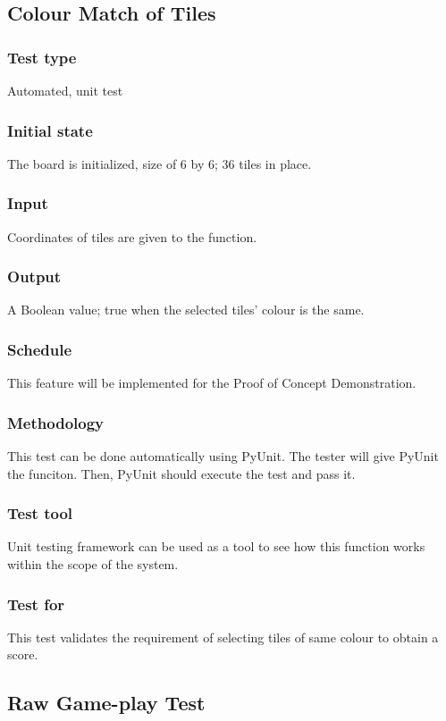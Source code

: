 \documentclass[12pt]{article}
\begin{document}
\newpage

\subsection{Colour Match of Tiles}
\subsubsection{Test type}
Automated, unit test
\subsubsection{Initial state}
The board is initialized, size of 6 by 6; 36 tiles in place.
\subsubsection{Input}
Coordinates of tiles are given to the function.
\subsubsection{Output}
A Boolean value; true when the selected tiles' colour is the same.
\subsubsection{Schedule}
This feature will be implemented for the Proof of Concept Demonstration.
\subsubsection{Methodology}
This test can be done automatically using PyUnit. The tester will give PyUnit the funciton. Then, PyUnit should execute the test and pass it.
\subsubsection{Test tool}
Unit testing framework can be used as a tool to see how this function works within the scope of the system. 
\subsubsection{Test for}
This test validates the requirement of selecting tiles of same colour to obtain a score.

\newpage

\subsection{Raw Game-play Test}
\end{document}
